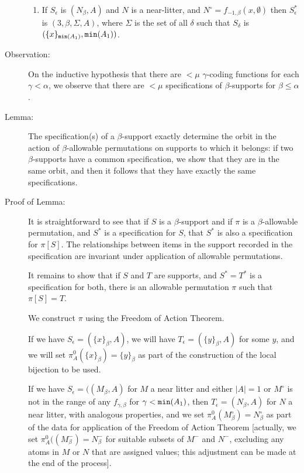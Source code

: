 \documentclass[112pt]{article}
\begin{document}
\begin{description}
\begin{enumerate}
\item  If $S_\epsilon$ is $(N_\beta,A)$ and $N$ is a near-litter, and $N^\circ=f_{-1,\beta}(x,\emptyset)$  then $S^*_\epsilon$ is $(3,\beta,\Sigma,A)$, where  $\Sigma$ is the set of all $\delta$ such that $S_\delta$ is $(\{x\}_{{\tt min}(A_1)},{\tt min}(A_1))$.

\end{enumerate}

\begin{comment}

Peter wants a definition of the type specification independent of the type support.  Use tags.   It's a good idea.

\end{comment}

\item[Observation:]  On the inductive hypothesis that there are $<\mu$ $\gamma$-coding functions for each $\gamma<\alpha$, we observe that there are $<\mu$ specifications of $\beta$-supports for $\beta\leq \alpha$.

\item[Lemma:]  The specification(s) of a $\beta$-support exactly determine the orbit in the action of $\beta$-allowable permutations on supports to which it belongs:  if two $\beta$-supports have a common specification, we show that they are in the same orbit, and then it follows that they have exactly the same specifications.

\item[Proof of Lemma:]

It is straightforward to see that if $S$ is a $\beta$-support and if $\pi$ is a $\beta$-allowable permutation, and $S^*$ is a specification for $S$, that $S^*$ is also a specification for $\pi[S]$.  The relationships between items in the support recorded in the specification are invariant under application of allowable permutations.

It remains to show that if $S$ and $T$ are supports, and $S^*=T^*$ is a specification for both, there is an allowable permutation $\pi$ such that $\pi[S]=T$.

We construct $\pi$ using the Freedom of Action Theorem.

If we have $S_\epsilon = (\{x\}_\beta,A)$, we will have $T_\epsilon = (\{y\}_\beta,A)$ for some $y$, and we will set $\pi^0_A(\{x\}_\beta) = \{y\}_\beta$ as part of the construction of the local bijection to be used.

If we have $S_\epsilon = ((M_\beta,A)$ for $M$ a near litter and either $|A|=1$ or $M^\circ$ is not in the range of any $f_{\gamma,\beta}$ for $\gamma<{\tt min}(A_1)$, then $T_\epsilon = (N_\beta,A)$ for $N$ a near litter, with analogous properties, and we set $\pi^0_A(M^\circ_\beta) = N^\circ_\beta$  as part of the data for application of the Freedom of Action Theorem [actually, we set $\pi^0_A((M^-_\beta) = N^-_\beta$  for suitable subsets of $M^-$ and $N^-$, excluding any atoms in $M$ or $N$ that are assigned values;  this adjustment can be made at the end of the process].



\end{description}
\end{document}
